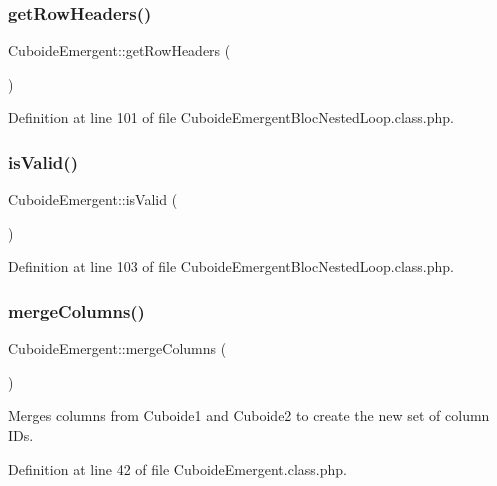 \subsubsection{\texorpdfstring{get\+Row\+Headers()}{getRowHeaders()}}
{\footnotesize\ttfamily Cuboide\+Emergent\+::get\+Row\+Headers (\begin{DoxyParamCaption}{ }\end{DoxyParamCaption})}



Definition at line 101 of file Cuboide\+Emergent\+Bloc\+Nested\+Loop.\+class.\+php.

\mbox{\label{class_cuboide_emergent_a3d0507e67863ed9ca9398ffbc6381c53}} 
\subsubsection{\texorpdfstring{is\+Valid()}{isValid()}}
{\footnotesize\ttfamily Cuboide\+Emergent\+::is\+Valid (\begin{DoxyParamCaption}{ }\end{DoxyParamCaption})}



Definition at line 103 of file Cuboide\+Emergent\+Bloc\+Nested\+Loop.\+class.\+php.

\mbox{\label{class_cuboide_emergent_afa115b70971c1b778813134a55406144}} 
\subsubsection{\texorpdfstring{merge\+Columns()}{mergeColumns()}\hspace{0.1cm}{\footnotesize\ttfamily [1/2]}}
{\footnotesize\ttfamily Cuboide\+Emergent\+::merge\+Columns (\begin{DoxyParamCaption}{ }\end{DoxyParamCaption})\hspace{0.3cm}{\ttfamily [protected]}}

Merges columns from Cuboide1 and Cuboide2 to create the new set of column I\+Ds. 

Definition at line 42 of file Cuboide\+Emergent.\+class.\+php.

